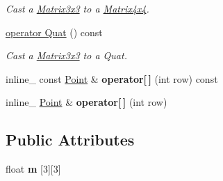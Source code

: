 \begin{DoxyCompactItemize}
\begin{DoxyCompactList}\small\item\em Cast a \hyperlink{class_matrix3x3}{Matrix3x3} to a \hyperlink{class_matrix4x4}{Matrix4x4}. \end{DoxyCompactList}\item 
\hypertarget{class_matrix3x3_aa3ecbe209786625479d28a7c34e5ed6f}{\hyperlink{class_matrix3x3_aa3ecbe209786625479d28a7c34e5ed6f}{operator Quat} () const }\label{class_matrix3x3_aa3ecbe209786625479d28a7c34e5ed6f}

\begin{DoxyCompactList}\small\item\em Cast a \hyperlink{class_matrix3x3}{Matrix3x3} to a Quat. \end{DoxyCompactList}\item 
\hypertarget{class_matrix3x3_a6acb17060e5f9fb57103abaf2e08f3cc}{inline\+\_\+ const \hyperlink{class_point}{Point} \& {\bfseries operator\mbox{[}$\,$\mbox{]}} (int row) const }\label{class_matrix3x3_a6acb17060e5f9fb57103abaf2e08f3cc}

\item 
\hypertarget{class_matrix3x3_a1b1b2ce1c019cdd3b9e286ff75550751}{inline\+\_\+ \hyperlink{class_point}{Point} \& {\bfseries operator\mbox{[}$\,$\mbox{]}} (int row)}\label{class_matrix3x3_a1b1b2ce1c019cdd3b9e286ff75550751}

\end{DoxyCompactItemize}
\subsection*{Public Attributes}
\begin{DoxyCompactItemize}
\item 
\hypertarget{class_matrix3x3_a909d707fd0c26b98f816c395f9530b49}{float {\bfseries m} \mbox{[}3\mbox{]}\mbox{[}3\mbox{]}}\label{class_matrix3x3_a909d707fd0c26b98f816c395f9530b49}

\end{DoxyCompactItemize}
